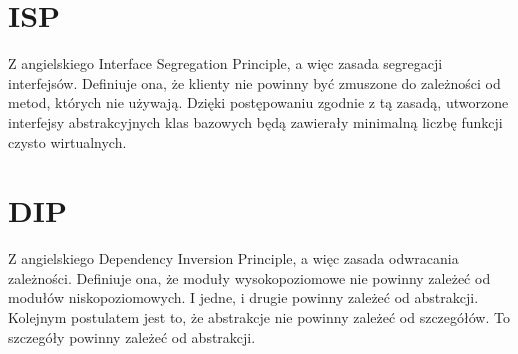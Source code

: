\section{ISP}
Z angielskiego Interface Segregation Principle, a więc zasada segregacji interfejsów.
Definiuje ona, że klienty nie powinny być zmuszone do zależności od metod, których nie używają.
\cite[151]{martin2015zwinne}
Dzięki postępowaniu zgodnie z tą zasadą, utworzone interfejsy abstrakcyjnych klas bazowych będą zawierały minimalną liczbę funkcji czysto wirtualnych.

\section{DIP}
Z angielskiego Dependency Inversion Principle, a więc zasada odwracania zależności.
Definiuje ona, że moduły wysokopoziomowe nie powinny zależeć od modułów niskopoziomowych. I jedne, i drugie powinny zależeć od abstrakcji.
\cite[141]{martin2015zwinne}
Kolejnym postulatem jest to, że abstrakcje nie powinny zależeć od szczegółów. To szczegóły powinny zależeć od abstrakcji.
\cite[141]{martin2015zwinne}
